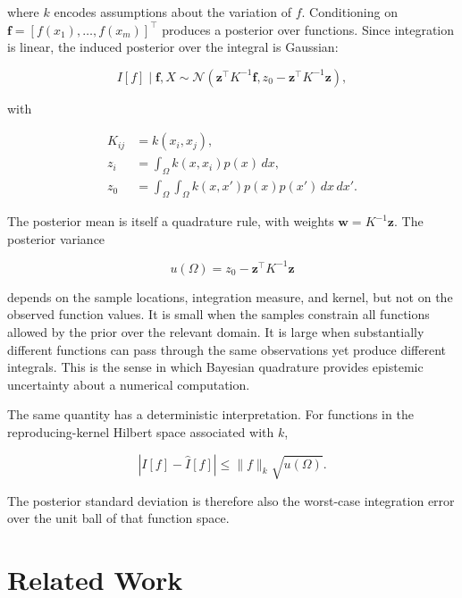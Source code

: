 \documentclass[letterpaper,10pt,conference]{ieeeconf}
\begin{document}
where $k$ encodes assumptions about the variation of $f$. Conditioning on
$\mathbf{f}=[f(x_1),\ldots,f(x_m)]^\top$ produces a posterior over functions.
Since integration is linear, the induced posterior over the integral is
Gaussian:

\begin{equation}
    I[f]\mid \mathbf f,X \sim
    \mathcal N\!\left(\mathbf z^\top K^{-1}\mathbf f,
    z_0-\mathbf z^\top K^{-1}\mathbf z\right),
    \label{eq:bq-posterior}
\end{equation}

with

\begin{align}
    K_{ij} &= k(x_i,x_j), \\
    z_i &= \int_{\Omega}k(x,x_i)p(x)\,dx, \\
    z_0 &= \int_{\Omega}\!\int_{\Omega}
    k(x,x')p(x)p(x')\,dx\,dx'.
\end{align}

The posterior mean is itself a quadrature rule, with weights
$\mathbf w=K^{-1}\mathbf z$. The posterior variance

\begin{equation}
    u(\Omega)=z_0-\mathbf z^\top K^{-1}\mathbf z
    \label{eq:variance}
\end{equation}

depends on the sample locations, integration measure, and kernel, but not on
the observed function values. It is small when the samples constrain all
functions allowed by the prior over the relevant domain. It is large when
substantially different functions can pass through the same observations yet
produce different integrals. This is the sense in which Bayesian quadrature
provides epistemic uncertainty about a numerical computation.

The same quantity has a deterministic interpretation. For functions in the
reproducing-kernel Hilbert space associated with $k$,

\begin{equation}
    |I[f]-\widehat I[f]|
    \leq \lVert f\rVert_k\sqrt{u(\Omega)}.
    \label{eq:error-bound}
\end{equation}

The posterior standard deviation is therefore also the worst-case integration
error over the unit ball of that function space.

\section{Related Work}
\end{document}
